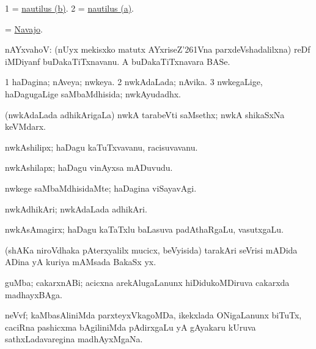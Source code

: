\noindent
\gl{\pagu}
\bmng
\bnum
\num{1}  = \hyperlink{nautilus(b)}{nautilus (b)}. 
\num{2}  = \hyperlink{nautilus(a)}{nautilus (a)}. 
\enum
\emng
\eentry

\bentry
{}
\gl{\nA}
\bmng
= \hyperlink{Navajo}{Navajo}.
\emng
\eentry

\bentry
{}
\gl{\nA}
\bmng
nAYxvahoV: 
\banum
{} (nUyx mekisxko matutx AYxriseZ\char'261Vna parxdeVshadalilxna) reDf iMDiyanf buDakaTiTxnavanu. 
 A buDakaTiTxnavara BASe. 
\eanum
\emng
\eentry

\bentry
{}
\gl{\gu}
\bmng
\bnum
\num{1} haDagina; nAveya; nwkeya. 
\num{2} nwkAdaLada; nAvika. 
\num{3} nwkegaLige, haDagugaLige saMbaMdhisida;  nwkAyudadhx. 
\enum
\emng
\eentry

\bentry
{}
\gl{\nA}
\bmng
(nwkAdaLada adhikArigaLa) nwkA tarabeVti saMsethx; nwkA shikaSxNa keVMdarx. 
\emng
\eentry

\bentry
{}
\gl{\nA}
\bmng
nwkAshilipx; haDagu kaTuTxvavanu, racisuvavanu. 
\emng
\eentry

\bentry
{}
\gl{\nA}
\bmng
nwkAshilapx; haDagu vinAyxsa mADuvudu. 
\emng
\eentry

\bentry
{}
\gl{\kirxvi}
\bmng
nwkege saMbaMdhisidaMte; haDagina viSayavAgi. 
\emng
\eentry

\bentry
{}
\gl{\nA}
\bmng
nwkAdhikAri; nwkAdaLada adhikAri. 
\emng
\eentry

\bentry
{}
\gl{\nA}
\bmng
nwkAsAmagirx; haDagu kaTaTxlu baLasuva padAthaRgaLu, vasutxgaLu. 
\emng
\eentry

\bentry
{}
\gl{\nA}
\bmng
(shAKa niroVdhaka pAterxyalilx mucicx, beVyisida) tarakAri seVrisi mADida ADina yA kuriya mAMsada BakaSx yx. 
\emng
\eentry

\bentry
{}
\gl{\nA}
\bmng
guMba; cakarxnABi; acicxna arekAlugaLanunx hiDidukoMDiruva cakarxda madhayxBAga. 
\emng
\eentry

\bentry
{}
\gl{\nA}
\bmng
neVvf; kaMbasAliniMda parxteyxVkagoMDa, ikekxlada ONigaLanunx biTuTx, caciRna pashicxma bAgiliniMda pAdirxgaLu yA gAyakaru kUruva sathxLadavaregina madhAyxMgaNa. 
\emng
\eentry


